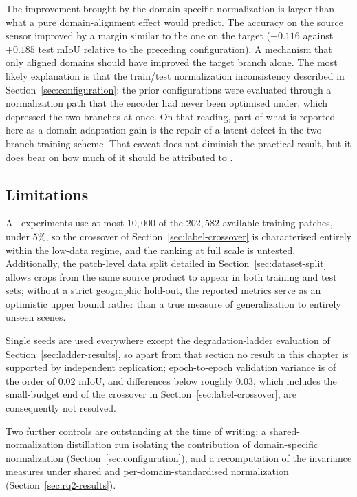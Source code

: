 The improvement brought by the domain-specific normalization is larger than what a pure domain-alignment effect would predict.
The accuracy on the source sensor improved by a margin similar to the one on the target ($+0.116$ against $+0.185$ test mIoU relative to the preceding configuration).
A mechanism that only aligned domains should have improved the target branch alone.
The most likely explanation is that the train/test normalization inconsistency described in Section~\ref{sec:configuration}: the prior configurations were evaluated through a normalization path that the encoder had never been optimised under, which depressed the two branches at once.
On that reading, part of what is reported here as a domain-adaptation gain is the repair of a latent defect in the two-branch training scheme.
That caveat does not diminish the practical result, but it does bear on how much of it should be attributed to .

\subsection{Limitations}
\label{sec:limitations}

All experiments use at most $10{,}000$ of the $202{,}582$ available training patches, under $5\%$, so the crossover of Section~\ref{sec:label-crossover} is characterised entirely within the low-data regime, and the ranking at full scale is untested.
Additionally, the patch-level data split detailed in Section~\ref{sec:dataset-split} allows crops from the same source product to appear in both training and test sets; without a strict geographic hold-out, the reported metrics serve as an optimistic upper bound rather than a true measure of generalization to entirely unseen scenes.

Single seeds are used everywhere except the degradation-ladder evaluation of Section~\ref{sec:ladder-results}, so apart from that section no result in this chapter is supported by independent replication; epoch-to-epoch validation variance is of the order of $0.02$ mIoU, and differences below roughly $0.03$, which includes the small-budget end of the crossover in Section~\ref{sec:label-crossover}, are consequently not resolved.

Two further controls are outstanding at the time of writing: a shared-normalization distillation run isolating the contribution of domain-specific normalization (Section~\ref{sec:configuration}), and a recomputation of the invariance measures under shared and per-domain-standardised normalization (Section~\ref{sec:rq2-results}).

